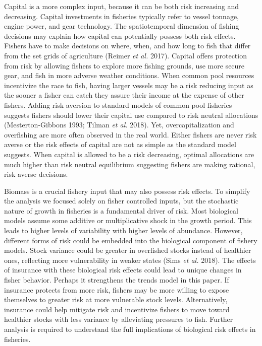 \documentclass[
  letterpaper,
  DIV=11,
  numbers=noendperiod]{scrartcl}
\theoremstyle{plain}
\theoremstyle{plain}
\theoremstyle{remark}
\begin{document}
Capital is a more complex input, because it can be both risk increasing
and decreasing. Capital investments in fisheries typically refer to
vessel tonnage, engine power, and gear technology. The spatiotemporal
dimension of fishing decisions may explain how capital can potentially
possess both risk effects. Fishers have to make decisions on where,
when, and how long to fish that differ from the set grids of agriculture
(Reimer \emph{et al.} 2017). Capital offers protection from risk by
allowing fishers to explore more fishing grounds, use more secure gear,
and fish in more adverse weather conditions. When common pool resources
incentivize the race to fish, having larger vessels may be a risk
reducing input as the sooner a fisher can catch they assure their income
at the expense of other fishers. Adding risk aversion to standard models
of common pool fisheries suggests fishers should lower their capital use
compared to risk neutral allocations (Mesterton-Gibbons 1993; Tilman
\emph{et al.} 2018). Yet, overcapitalization and overfishing are more
often observed in the real world. Either fishers are never risk averse
or the risk effects of capital are not as simple as the standard model
suggests. When capital is allowed to be a risk decreasing, optimal
allocations are much higher than risk neutral equilibrium suggesting
fishers are making rational, risk averse decisions.

Biomass is a crucial fishery input that may also possess risk effects.
To simplify the analysis we focused solely on fisher controlled inputs,
but the stochastic nature of growth in fisheries is a fundamental driver
of risk. Most biological models assume some additive or multiplicative
shock in the growth period. This leads to higher levels of variability
with higher levels of abundance. However, different forms of risk could
be embedded into the biological component of fishery models. Stock
variance could be greater in overfished stocks instead of healthier
ones, reflecting more vulnerability in weaker states (Sims \emph{et al.}
2018). The effects of insurance with these biological risk effects could
lead to unique changes in fisher behavior. Perhaps it strengthens the
trends model in this paper. If insurance protects from more risk,
fishers may be more willing to expose themselves to greater risk at more
vulnerable stock levels. Alternatively, insurance could help mitigate
risk and incentivize fishers to move toward healthier stocks with less
variance by alleviating pressures to fish. Further analysis is required
to understand the full implications of biological risk effects in
fisheries.
\end{document}
